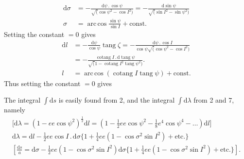 \par\clearpage
\noindent\makebox[12mm][l]{}\par\medskip

\[
\begin{aligned}
\mathrm d\sigma
&=-\frac{\mathrm d\psi\,.\,\cos\psi}{\surd(\cos\psi^2-\cos I^2)}
=-\frac{\mathrm d\sin\psi}{\surd(\sin I^2-\sin\psi^2)}\\
\sigma&=\operatorname{arc\,cos}\frac{\sin\psi}{\sin I}+\text{const.}
\end{aligned}
\]
\noindent Setting the constant \(=0\) gives
\noindent [Furthermore,]
\[
\begin{aligned}
\mathrm dl&=-\frac{\mathrm d\psi}{\cos\psi}\operatorname{tang}\zeta
=-\frac{\mathrm d\psi\,.\,\cos I}{\cos\psi\surd(\cos\psi^2-\cos I^2)}\\
&=-\frac{\operatorname{cotang}I\,.\,\mathrm d\operatorname{tang}\psi}
{\surd(1-\operatorname{cotang}I^2\operatorname{tang}\psi^2)}.\\
l&=\operatorname{arc\,cos}(\operatorname{cotang}I\operatorname{tang}\psi)+\text{const.}
\end{aligned}
\]
\noindent Thus setting the constant \(=0\) gives
\noindent [consequently]

\noindent The integral \(\int\mathrm ds\) is easily found from 2, and the integral \(\int\mathrm d\lambda\)
from 2 and 7, namely
\[
\begin{gathered}
{[}\mathrm d\lambda=(1-ee\cos\psi^2)^{\frac12}\mathrm dl
=(1-\tfrac12 ee\cos\psi^2-\tfrac18e^4\cos\psi^4-\ldots)\mathrm dl]\\
\mathrm d\lambda=\mathrm dl-\tfrac12ee\cos I\,.\,\mathrm d\sigma
\{1+\tfrac14 ee(1-\cos\sigma^2\sin I^2)+\text{etc.}\}\\
\left[\frac{\mathrm ds}a=\mathrm d\sigma-\tfrac12ee(1-\cos\sigma^2\sin I^2)\mathrm d\sigma
\{1+\tfrac14 ee(1-\cos\sigma^2\sin I^2)+\text{etc.}\}\right].
\end{gathered}
\]

